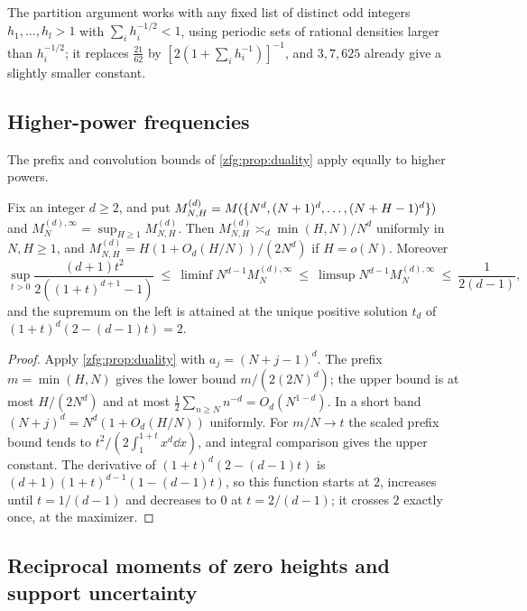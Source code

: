 The partition argument works with any fixed list of distinct odd integers $h_1,\dots,h_l>1$ with $\sum_ih_i^{-1/2}<1$,
using periodic sets of rational densities larger than $h_i^{-1/2}$; it replaces $\tfrac{21}{62}$ by
$[2(1+\sum_ih_i^{-1})]^{-1}$, and $3,7,625$ already give a slightly smaller constant.

\subsection{Higher-power frequencies}\label{zfg:sec:powers}

The prefix and convolution bounds of \cref{zfg:prop:duality} apply equally to higher powers.

\begin{corollary}\label{zfg:cor:powers}
Fix an integer $d\ge2$, and put $M^{(d)}_{N,H}=M(\{N^d,(N+1)^d,\dots,(N+H-1)^d\})$ and $M_N^{(d),\infty}=\sup_{H\ge1}M^{(d)}_{N,H}$. Then
$M^{(d)}_{N,H}\asymp_d\min(H,N)/N^d$ uniformly in $N,H\ge1$, and $M^{(d)}_{N,H}=H(1+O_d(H/N))/(2N^d)$ if $H=o(N)$. Moreover
\[
 \sup_{t>0}\frac{(d+1)t^2}{2((1+t)^{d+1}-1)}\ \le\ \liminf N^{d-1}M_N^{(d),\infty}\ \le\ \limsup N^{d-1}M_N^{(d),\infty}\ \le\ \frac1{2(d-1)},
\]
and the supremum on the left is attained at the unique positive solution $t_d$ of $(1+t)^d(2-(d-1)t)=2$.
\end{corollary}

\begin{proof}
Apply \cref{zfg:prop:duality} with $a_j=(N+j-1)^d$. The prefix $m=\min(H,N)$ gives the lower bound $m/(2(2N)^d)$; the upper
bound is at most $H/(2N^d)$ and at most $\tfrac12\sum_{n\ge N}n^{-d}=O_d(N^{1-d})$. In a short band $(N+j)^d=N^d(1+O_d(H/N))$
uniformly. For $m/N\to t$ the scaled prefix bound tends to $t^2/(2\int_1^{1+t}x^d\dd x)$, and integral comparison gives the
upper constant. The derivative of $(1+t)^d(2-(d-1)t)$ is $(d+1)(1+t)^{d-1}(1-(d-1)t)$, so this function starts at $2$, increases
until $t=1/(d-1)$ and decreases to $0$ at $t=2/(d-1)$; it crosses $2$ exactly once, at the maximizer.
\end{proof}

\subsection{Reciprocal moments of zero heights and support uncertainty}\label{zfg:sec:recip}

